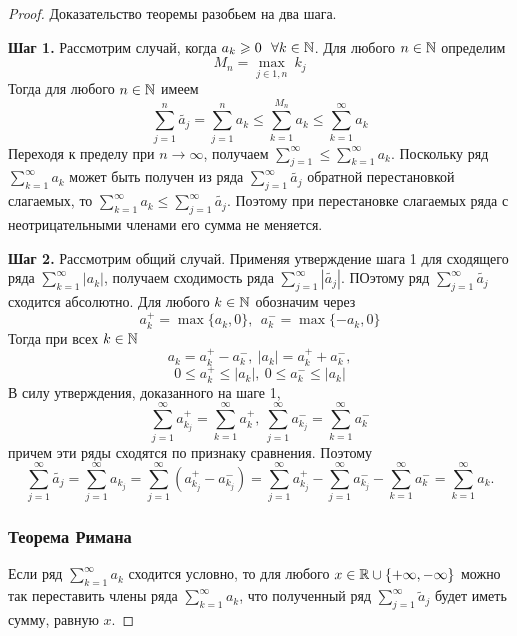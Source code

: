 \documentclass[12pt, a4paper]{article}
\begin{document}
    \begin{proof}
        Доказательство теоремы разобьем на два шага.

        \textbf{Шаг 1.} Рассмотрим случай, когда $a_k \geqslant 0 \ \ \forall k \in \mathbb{N}$. Для любого $n \in \mathbb{N}$ определим
        \begin{equation*}
            M_n = \underset{j \in 1, n}{\max} \ k_j
        \end{equation*}
        Тогда для любого $n \in \mathbb{N}$ имеем
        \begin{equation*}
            \sum_{j=1}^{n} \widetilde{a_j} = \sum_{j=1}^{n} a_k \leq \sum_{k=1}^{M_n} a_k \leq \sum_{k=1}^{\infty} a_k
        \end{equation*}
        Переходя к пределу при $n \to \infty$, получаем $\sum_{j=1}^{\infty} \leq \sum_{k=1}^{\infty} a_k$. Поскольку ряд $\sum_{k=1}^{\infty} a_k$ может быть получен из ряда $\sum_{j=1}^{\infty} \widetilde{a_j}$ обратной перестановкой слагаемых, то $\sum_{k=1}^{\infty} a_k \leq \sum_{j=1}^{\infty} \widetilde{a_j}$. Поэтому при перестановке слагаемых ряда с неотрицательными членами его сумма не меняется.

    \textbf{Шаг 2.} Рассмотрим общий случай. Применяя утверждение шага 1 для сходящего ряда $\sum_{k=1}^{\infty} |a_k|$, получаем сходимость ряда $\sum_{j=1}^{\infty} |\widetilde{a_j}|$. ПОэтому ряд $\sum_{j=1}^{\infty} \widetilde{a_j}$ сходится абсолютно. Для любого $k \in \mathbb{N}$ обозначим через
    \begin{equation*}
        a_k^+ = \max \{a_k, 0\}, \ \ a_k^- = \max \{-a_k, 0\}
    \end{equation*}
    Тогда при всех $k \in \mathbb{N}$
    \begin{equation*}
        a_k = a_k^+ - a_k^-, \ |a_k| = a_k^+ + a_k^-,
    \end{equation*}
    \begin{equation*}
        0 \leq a_k^+ \leq |a_k|, \ 0 \leq a_k^- \leq |a_k|
    \end{equation*}
    В силу утверждения, доказанного на шаге 1,
    \begin{equation*}
        \sum_{j=1}^{\infty} a_{k_j}^+ = \sum_{k=1}^{\infty} a_k^+, \ \sum_{j=1}^{\infty} a_{k_j}^- = \sum_{k=1}^{\infty} a_k^-
    \end{equation*}
    причем эти ряды сходятся по признаку сравнения. Поэтому
    \begin{equation*}
        \sum_{j=1}^{\infty} \widetilde{a_j} = \sum_{j=1}^{\infty} a_{k_j} = \sum_{j=1}^{\infty} \left(a_{k_j}^+ - a_{k_j}^-\right) = \sum_{j=1}^{\infty} a_{k_j}^+ - \sum_{j=1}^{\infty} a_{k_j}^- - \sum_{k=1}^{\infty} a_k^- = \sum_{k=1}^{\infty} a_k.
    \end{equation*}
    \subsubsection{Теорема Римана}
    Если ряд $\sum_{k=1}^{\infty} a_k$ сходится условно, то для любого $x \in \mathbb{R} \cup \{+\infty, -\infty\}$ можно так переставить члены ряда $\sum_{k=1}^{\infty} a_k$, что полученный ряд $\sum_{j=1}^{\infty} \widetilde{a}_j$ будет иметь сумму, равную $x$.
\end{proof}
\end{document}
